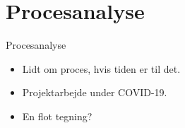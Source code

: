 \section{Procesanalyse}
\begin{frame}{Procesanalyse}
\begin{itemize}
\item Lidt om proces, hvis tiden er til det. 
\item Projektarbejde under COVID-19.
\item En flot tegning? 
\end{itemize}
\end{frame}
